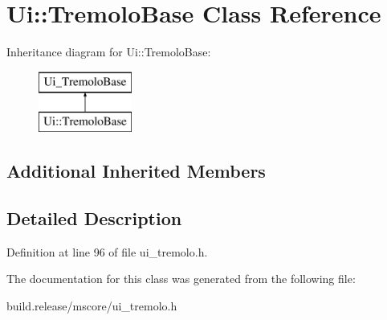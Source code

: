 \hypertarget{class_ui_1_1_tremolo_base}{}\section{Ui\+:\+:Tremolo\+Base Class Reference}
\label{class_ui_1_1_tremolo_base}
Inheritance diagram for Ui\+:\+:Tremolo\+Base\+:\begin{figure}[H]
\begin{center}
\leavevmode
\includegraphics[height=2.000000cm]{class_ui_1_1_tremolo_base}
\end{center}
\end{figure}
\subsection*{Additional Inherited Members}


\subsection{Detailed Description}


Definition at line 96 of file ui\+\_\+tremolo.\+h.



The documentation for this class was generated from the following file\+:\begin{DoxyCompactItemize}
\item 
build.\+release/mscore/ui\+\_\+tremolo.\+h\end{DoxyCompactItemize}
